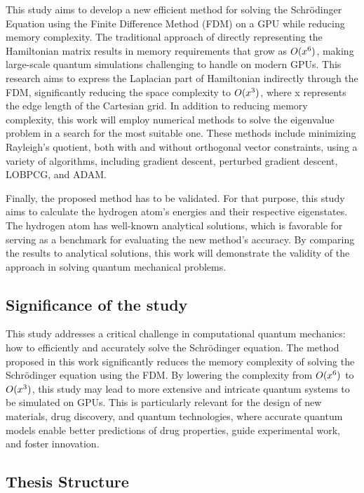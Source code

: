 This study aims to develop a new efficient method for solving the Schrödinger Equation using the Finite Difference Method (FDM) on a GPU while reducing memory complexity. The traditional approach of directly representing the Hamiltonian matrix results in memory requirements that grow as $O(x\textsuperscript{6})$, making large-scale quantum simulations challenging to handle on modern GPUs. This research aims to express the Laplacian part of Hamiltonian indirectly through the FDM, significantly reducing the space complexity to $O(x\textsuperscript{3})$, where x represents the edge length of the Cartesian grid.
In addition to reducing memory complexity, this work will employ numerical methods to solve the eigenvalue problem in a search for the most suitable one. These methods include minimizing Rayleigh's quotient, both with and without orthogonal vector constraints, using a variety of algorithms, including gradient descent, perturbed gradient descent, LOBPCG, and ADAM.

Finally, the proposed method has to be validated. For that purpose, this study aims to calculate the hydrogen atom's energies and their respective eigenstates. The hydrogen atom has well-known analytical solutions, which is favorable for serving as a benchmark for evaluating the new method's accuracy. By comparing the results to analytical solutions, this work will demonstrate the validity of the approach in solving quantum mechanical problems.

\subsection{Significance of the study}

This study addresses a critical challenge in computational quantum mechanics: how to efficiently and accurately solve the Schrödinger equation. The method proposed in this work significantly reduces the memory complexity of solving the Schrödinger equation using the FDM. By lowering the complexity from $O(x\textsuperscript{6})$ to $O(x\textsuperscript{3})$, this study may lead to more extensive and intricate quantum systems to be simulated on GPUs. This is particularly relevant for the design of new materials, drug discovery, and quantum technologies, where accurate quantum models enable better predictions of drug properties, guide experimental work, and foster innovation.

\subsection{Thesis Structure}

